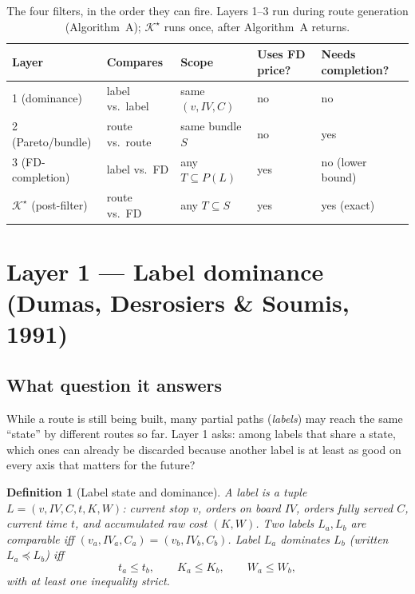 \documentclass[11pt]{article}
\newtheorem{definition}{Definition}
\newcommand{\Ks}{\mathcal{K}^{\star}}
\begin{document}
\begin{table}[h]
\centering
\begin{tabular}{@{}lllll@{}}
\toprule
Layer & Compares & Scope & Uses FD price? & Needs completion? \\
\midrule
1 (dominance)      & label vs.\ label        & same $(v,IV,C)$        & no  & no  \\
2 (Pareto/bundle)   & route vs.\ route        & same bundle $S$        & no  & yes \\
3 (FD-completion)   & label vs.\ FD           & any $T\subseteq P(L)$  & yes & no (lower bound) \\
$\Ks$ (post-filter) & route vs.\ FD           & any $T\subseteq S$     & yes & yes (exact) \\
\bottomrule
\end{tabular}
\caption{The four filters, in the order they can fire. Layers 1--3 run during route
generation (Algorithm~A); $\Ks$ runs once, after Algorithm~A returns.}
\label{tab:overview}
\end{table}

\section{Layer 1 --- Label dominance (Dumas, Desrosiers \& Soumis, 1991)}

\subsection{What question it answers}
While a route is still being built, many partial paths (\emph{labels}) may reach the same
``state'' by different routes so far. Layer 1 asks: among labels that share a state, which
ones can already be discarded because another label is at least as good on every axis that
matters for the future?

\begin{definition}[Label state and dominance]\label{def:label-dom}
A label is a tuple $L=(v,IV,C,t,K,W)$: current stop $v$, orders on board $IV$, orders fully
served $C$, current time $t$, and accumulated raw cost $(K,W)$. Two labels $L_a,L_b$ are
\emph{comparable} iff $(v_a,IV_a,C_a)=(v_b,IV_b,C_b)$. Label $L_a$ \emph{dominates} $L_b$
(written $L_a\preceq L_b$) iff
\[
t_a\le t_b,\qquad K_a\le K_b,\qquad W_a\le W_b,
\]
with at least one inequality strict.
\end{definition}
\end{document}
